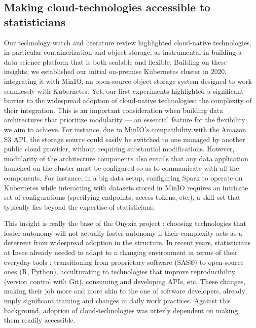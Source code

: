 \documentclass[graybox]{svmult}
\begin{document}
\subsection{Making cloud-technologies accessible to statisticians}

Our technology watch and literature review highlighted cloud-native technologies, in particular containerization and object storage, as instrumental in building a data science platform that is both scalable and flexible. Building on these insights, we established our initial on-premise Kubernetes cluster in 2020, integrating it with MinIO, an open-source object storage system designed to work seamlessly with Kubernetes. Yet, our first experiments highlighted a significant barrier to the widespread adoption of cloud-native technologies: the complexity of their integration. This is an important consideration when building data architectures that prioritize modularity — an essential feature for the flexibility we aim to achieve. For instance, due to MinIO's compatibility with the Amazon S3 API, the storage source could easily be switched to  one managed by another public cloud provider, without requiring substantial modifications. However, modularity of the architecture components also entails that any data application launched on the cluster must be configured so as to communicate with all the components. For instance, in a big data setup, configuring Spark to operate on Kubernetes while interacting with datasets stored in MinIO requires an intricate set of configurations (specifying endpoints, access tokens, etc.), a skill set that typically lies beyond the expertise of statisticians.

This insight is really the base of the Onyxia project : choosing technologies that foster autonomy will not actually foster autonomy if their complexity acts as a deterrent from widespread adoption in the structure. In recent years, statisticians at Insee already needed to adapt to a changing environment in terms of their everyday tools : transitioning from proprietary software (SAS®) to open-source ones (R, Python), acculturating to technologies that improve reproducibility (version control with Git), consuming and developing APIs, etc. These changes, making their job more and more akin to the one of software developers, already imply significant training and changes in daily work practices. Against this background, adoption of cloud-technologies was utterly dependent on making them readily accessible.
\end{document}
